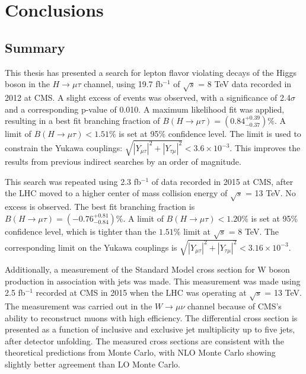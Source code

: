 \documentclass[oneside, letterpaper, oldfontcommands]{memoir}
\begin{document}
\begin{table}
\chapter{Conclusions}
\section{Summary}
\qquad This thesis has presented a search for lepton flavor violating decays of the Higgs boson in the $H \rightarrow \mu \tau$ channel, using 19.7 fb$^{-1}$ of $\sqrt{s}$ = 8 TeV data recorded in 2012 at CMS. 
A slight excess of events was observed, with a significance of 2.4$\sigma$ and a corresponding p-value of 0.010. A maximum likelihood fit was applied, 
resulting in a best fit branching fraction of $B(H \rightarrow \mu \tau) = (0.84^{+0.39}_{-0.37})\%$. 
A limit of $B(H\rightarrow \mu\tau) < 1.51\%$ is set at 95\% confidence level. The limit is used to constrain the Yukawa couplings: $\sqrt{|Y_{\mu\tau}|^{2} + |Y_{\tau\mu}|^{2}} < 3.6 \times 10^{-3}$. This improves the results from previous indirect searches by an order of magnitude. 

\qquad This search was repeated using 2.3 fb$^{-1}$ of data recorded in 2015 at CMS, after the LHC moved to a higher center of mass collision energy of $\sqrt{s}$ = 13 TeV. No excess is observed. The best fit branching fraction is $B(H \rightarrow \mu\tau) = (-0.76^{+0.81}_{-0.84})\%$. A limit of $B(H \rightarrow \mu\tau) < 1.20\%$ is set at 95\% confidence level, which is tighter than the $1.51\%$ limit at $\sqrt{s}$ = 8 TeV. The corresponding limit on the Yukawa couplings is $\sqrt{|Y_{\mu\tau}|^{2} + |Y_{\tau\mu}|^{2}} < 3.16 \times 10^{-3}$.

\qquad Additionally, a measurement of the Standard Model cross section for W boson production in association with jets was made. This measurement was made using 2.5 fb$^{-1}$ recorded at CMS in 2015 when the LHC was operating at $\sqrt{s}$ = 13 TeV. The measurement was carried out in the $W \rightarrow \mu \nu$ channel because of CMS's ability to reconstruct muons with high efficiency. The differential cross section is presented as a function of inclusive and exclusive jet multiplicity up to five jets, after detector unfolding. The measured cross sections are consistent with the theoretical predictions from Monte Carlo, with NLO Monte Carlo showing slightly better agreement than LO Monte Carlo.


\end{table}
\end{document}
